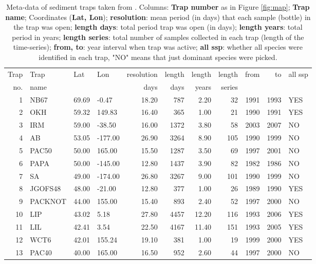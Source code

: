 \documentclass[a4paper]{article}
\begin{document}
\begin{table}
\center
\footnotesize
\caption{\label{table:traps_data} Meta-data of sediment traps taken from \citep{jonkers2015global}. Columns: \textbf{Trap number} as in Figure \ref{fig:map}; \textbf{Trap name}; Coordinates (\textbf{Lat, Lon}); \textbf{resolution}: mean period (in days) that each sample (bottle) in the trap was open; \textbf{length days}: total period trap was open (in days); \textbf{length years}: total period in years; \textbf{length series}: total number of samples collected in each trap (length of the time-series); \textbf{from, to}: year interval when trap was active; \textbf{all ssp}: whether all species were identified in each trap, "NO" means that just dominant species were picked.}
\begin{tabular}{rlllrrrrrrl}
  \hline
Trap & Trap & Lat & Lon & resolution & length & length & length & from & to & all ssp \\ 
no.  & name &  &  & days & days & years & series &  &   &  \\ 
  \hline
  1 & NB67 & 69.69 & -0.47 & 18.20 & 787 & 2.20 &  32 & 1991 & 1993 & YES \\ 
    2 & OKH & 59.32 & 149.83 & 16.40 & 365 & 1.00 &  21 & 1990 & 1991 & YES \\ 
    3 & IRM & 59.00 & -38.50 & 16.00 & 1372 & 3.80 &  58 & 2003 & 2007 & NO \\ 
    4 & AB & 53.05 & -177.00 & 26.90 & 3264 & 8.90 & 105 & 1990 & 1999 & NO \\ 
    5 & PAC50 & 50.00 & 165.00 & 15.50 & 1287 & 3.50 &  69 & 1997 & 2001 & NO \\ 
    6 & PAPA & 50.00 & -145.00 & 12.80 & 1437 & 3.90 &  82 & 1982 & 1986 & NO \\ 
    7 & SA & 49.00 & -174.00 & 26.80 & 3267 & 9.00 & 101 & 1990 & 1999 & NO \\ 
    8 & JGOFS48 & 48.00 & -21.00 & 12.80 & 377 & 1.00 &  26 & 1989 & 1990 & YES \\ 
    9 & PACKNOT & 44.00 & 155.00 & 15.40 & 893 & 2.40 &  52 & 1997 & 2000 & NO \\ 
   10 & LIP & 43.02 & 5.18 & 27.80 & 4457 & 12.20 & 116 & 1993 & 2006 & YES \\ 
   11 & LIL & 42.41 & 3.54 & 22.50 & 4167 & 11.40 & 151 & 1993 & 2005 & YES \\ 
   12 & WCT6 & 42.01 & 155.24 & 19.10 & 381 & 1.00 &  19 & 1999 & 2000 & YES \\ 
   13 & PAC40 & 40.00 & 165.00 & 16.50 & 952 & 2.60 &  44 & 1997 & 2000 & NO \\ 

\end{tabular}
\end{table}
\end{document}
